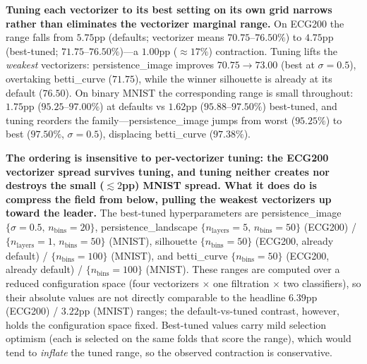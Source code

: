 \documentclass[12pt, a4paper]{report}
\theoremstyle{definition}
\theoremstyle{plain}
\theoremstyle{remark}
\begin{document}
\textbf{Tuning each vectorizer to its best setting on its own grid narrows
rather than eliminates the vectorizer marginal range.} On ECG200 the range falls
from $5.75$pp (defaults; vectorizer means $70.75$--$76.50\%$) to $4.75$pp
(best-tuned; $71.75$--$76.50\%$)---a $1.00$pp ($\approx 17\%$) contraction. Tuning lifts the \emph{weakest} vectorizers: persistence\_image improves
$70.75 \to 73.00$ (best at $\sigma{=}0.5$), overtaking betti\_curve ($71.75$),
while the winner silhouette is already at its default ($76.50$). On binary MNIST
the corresponding range is small throughout: $1.75$pp ($95.25$--$97.00\%$) at
defaults vs $1.62$pp ($95.88$--$97.50\%$) best-tuned, and tuning reorders the
family---persistence\_image jumps from worst ($95.25\%$) to best ($97.50\%$,
$\sigma{=}0.5$), displacing betti\_curve ($97.38\%$).

\textbf{The ordering is insensitive to per-vectorizer tuning: the ECG200 vectorizer spread survives tuning,
and tuning neither creates nor destroys the small ($\lesssim 2$pp) MNIST spread.
What it does do is compress the field from below, pulling the weakest vectorizers
up toward the leader.} The best-tuned hyperparameters are persistence\_image
$\{\sigma{=}0.5,\, n_{\textrm{bins}}{=}20\}$, persistence\_landscape
$\{n_{\textrm{layers}}{=}5,\, n_{\textrm{bins}}{=}50\}$ (ECG200) /
$\{n_{\textrm{layers}}{=}1,\, n_{\textrm{bins}}{=}50\}$ (MNIST), silhouette
$\{n_{\textrm{bins}}{=}50\}$ (ECG200, already default) /
$\{n_{\textrm{bins}}{=}100\}$ (MNIST), and betti\_curve
$\{n_{\textrm{bins}}{=}50\}$ (ECG200, already default) /
$\{n_{\textrm{bins}}{=}100\}$ (MNIST). These ranges are computed over a reduced
configuration space (four vectorizers $\times$ one filtration $\times$ two
classifiers), so their absolute values are not directly comparable to the
headline $6.39$pp (ECG200) / $3.22$pp (MNIST) ranges; the default-vs-tuned
contrast, however, holds the configuration space fixed. Best-tuned values carry
mild selection optimism (each is selected on the same folds that score the
range), which would tend to \emph{inflate} the tuned range, so the observed
contraction is conservative.
\end{document}
